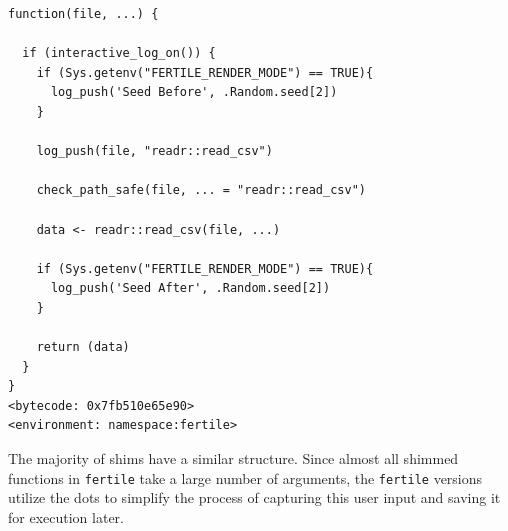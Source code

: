 \documentclass[12pt,twoside]{reedthesis}
\begin{document}
\begin{verbatim}
function(file, ...) {

  if (interactive_log_on()) {
    if (Sys.getenv("FERTILE_RENDER_MODE") == TRUE){
      log_push('Seed Before', .Random.seed[2])
    }

    log_push(file, "readr::read_csv")

    check_path_safe(file, ... = "readr::read_csv")

    data <- readr::read_csv(file, ...)

    if (Sys.getenv("FERTILE_RENDER_MODE") == TRUE){
      log_push('Seed After', .Random.seed[2])
    }

    return (data)
  }
}
<bytecode: 0x7fb510e65e90>
<environment: namespace:fertile>
\end{verbatim}
The majority of shims have a similar structure. Since almost all shimmed
functions in \texttt{fertile} take a large number of arguments, the
\texttt{fertile} versions utilize the dots to simplify the process of
capturing this user input and saving it for execution later.
\end{document}
